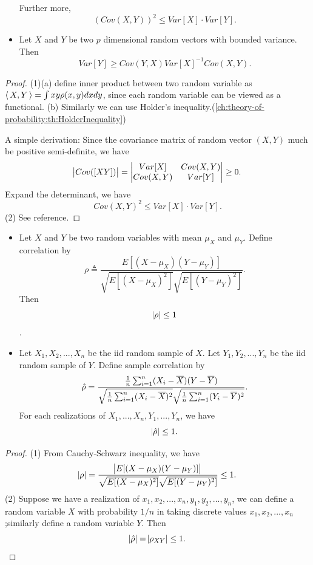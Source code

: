 \begin{refsection}
\begin{theorem}
\begin{itemize}
	Further more,
	$$(Cov(X, Y))^2 \leq Var[X]\cdot Var[Y].$$
	\item Let $X$ and $Y$ be two $p$ dimensional random vectors with bounded variance. Then
	$$Var[Y] \geq Cov(Y,X)Var[X]^{-1}Cov(X,Y).$$
\end{itemize}	
		


\end{theorem}
\begin{proof}
(1)(a)	define inner product between two random variable as ${\left< \, X,Y \, \right>} = \int xy\rho(x,y)dxdy$, since each random variable can be viewed as a functional. 
(b) Similarly we can use Holder's inequality.(\autoref{ch:theory-of-probability:th:HolderInequality})

A simple derivation:
Since the covariance matrix of random vector $(X, Y)$ much be positive semi-definite, we have
$$\abs{Cov([X Y])} = \begin{vmatrix}
Var[X] & Cov(X,Y) \\
Cov(X,Y) & Var[Y]
\end{vmatrix} \geq 0.$$
Expand the determinant, we have
$$Cov(X,Y)^2 \leq Var[X]\cdot Var[Y].$$
(2) See reference.
\end{proof}

\begin{corollary}\label{ch:theory-of-probability:th:Cauchy-SchwarzInequalityBoundsOnCorrelations}\hfill
\begin{itemize}
	\item Let $X$ and $Y$ be two random variables with mean $\mu_X$ and $\mu_Y$. Define correlation by
	$$\rho \triangleq \frac{E[(X-\mu_X)(Y-\mu_Y)]}{\sqrt{E[(X-\mu_X)^2]}\sqrt{E[(Y-\mu_Y)^2]}}.$$
	Then $$\abs{\rho} \leq 1$$.
	\item Let $X_1,X_2,...,X_n$ be the iid random sample of $X$. Let $Y_1,Y_2,...,Y_n$ be the iid random sample of $Y$. Define sample correlation by
	$$\hat{\rho} = \frac{\frac{1}{n}\sum_{i=1}^n (X_i - \overline{X})(Y-\overline{Y})}{\sqrt{\frac{1}{n}\sum_{i=1}^n (X_i - \overline{X})^2}\sqrt{\frac{1}{n}\sum_{i=1}^n (Y_i - \overline{Y})^2}}.$$
	For each realizations of $X_1,...,X_n, Y_1,...,Y_n$, we have
	$$\abs{\hat{\rho}}\leq 1. $$		
\end{itemize}	
\end{corollary}
\begin{proof}
(1) From Cauchy-Schwarz inequality, we have
$$\abs{\rho} = \frac{\abs{E[(X-\mu_X)(Y-\mu_Y)]}}{\sqrt{E[(X-\mu_X)^2]}\sqrt{E[(Y-\mu_Y)^2]}} \leq 1.$$
(2) Suppose we have a realization of $x_1,x_2,...,x_n, y_1,y_2,...,y_n$, we can define a random variable $X$ with probability $1/n$ in taking discrete values $x_1,x_2,...,x_n$;similarly define a random variable $Y$.
Then
$$\abs{\hat{\rho}} = \abs{\rho_{XY}} \leq 1.$$
\end{proof}




\end{refsection}
